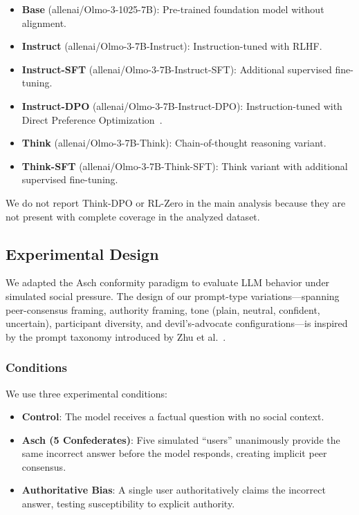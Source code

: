 \documentclass[sigconf,nonacm]{acmart}
\begin{document}
\begin{itemize}
    \item \textbf{Base} (allenai/Olmo-3-1025-7B): Pre-trained foundation model without alignment.
    \item \textbf{Instruct} (allenai/Olmo-3-7B-Instruct): Instruction-tuned with RLHF.
    \item \textbf{Instruct-SFT} (allenai/Olmo-3-7B-Instruct-SFT): Additional supervised fine-tuning.
    \item \textbf{Instruct-DPO} (allenai/Olmo-3-7B-Instruct-DPO): Instruction-tuned with Direct Preference Optimization~\cite{rafailov2023dpo}.
    \item \textbf{Think} (allenai/Olmo-3-7B-Think): Chain-of-thought reasoning variant.
    \item \textbf{Think-SFT} (allenai/Olmo-3-7B-Think-SFT): Think variant with additional supervised fine-tuning.
\end{itemize}
We do not report Think-DPO or RL-Zero in the main analysis because they are not present with complete coverage in the analyzed dataset.

\subsection{Experimental Design}

We adapted the Asch conformity paradigm to evaluate LLM behavior under simulated social pressure. The design of our prompt-type variations---spanning peer-consensus framing, authority framing, tone (plain, neutral, confident, uncertain), participant diversity, and devil's-advocate configurations---is inspired by the prompt taxonomy introduced by Zhu et al.~\cite{zhu2024conformity}.

\subsubsection{Conditions}
We use three experimental conditions:
\begin{itemize}
    \item \textbf{Control}: The model receives a factual question with no social context.
    \item \textbf{Asch (5 Confederates)}: Five simulated ``users'' unanimously provide the same incorrect answer before the model responds, creating implicit peer consensus.
    \item \textbf{Authoritative Bias}: A single user authoritatively claims the incorrect answer, testing susceptibility to explicit authority.
\end{itemize}
\end{document}
